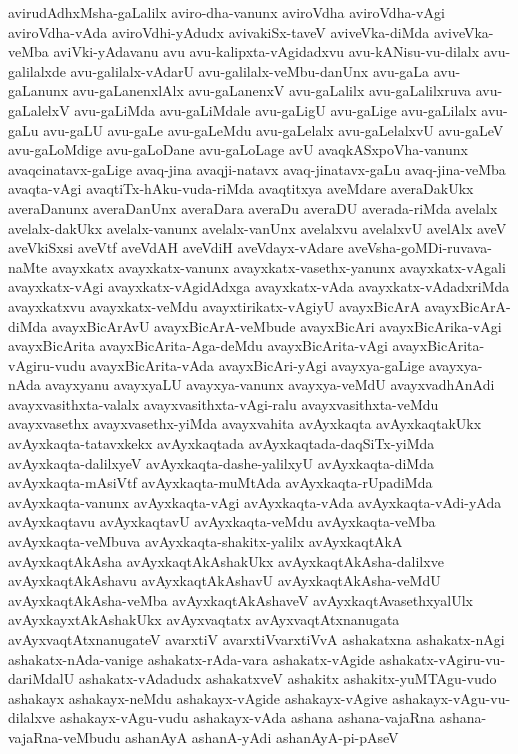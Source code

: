 {avirudAdhxMsha-gaLalilx
aviro-dha-vanunx
aviroVdha
aviroVdha-vAgi
aviroVdha-vAda
aviroVdhi-yAdudx
avivakiSx-taveV
aviveVka-diMda
aviveVka-veMba
aviVki-yAdavanu
avu
avu-kalipxta-vAgidadxvu
avu-kANisu-vu-dilalx
avu-galilalxde
avu-galilalx-vAdarU
avu-galilalx-veMbu-danUnx
avu-gaLa
avu-gaLanunx
avu-gaLanenxlAlx
avu-gaLanenxV
avu-gaLalilx
avu-gaLalilxruva
avu-gaLalelxV
avu-gaLiMda
avu-gaLiMdale
avu-gaLigU
avu-gaLige
avu-gaLilalx
avu-gaLu
avu-gaLU
avu-gaLe
avu-gaLeMdu
avu-gaLelalx
avu-gaLelalxvU
avu-gaLeV
avu-gaLoMdige
avu-gaLoDane
avu-gaLoLage
avU
avaqkASxpoVha-vanunx
avaqcinatavx-gaLige
avaq-jina
avaqji-natavx
avaq-jinatavx-gaLu
avaq-jina-veMba
avaqta-vAgi
avaqtiTx-hAku-vuda-riMda
avaqtitxya
aveMdare
averaDakUkx
averaDanunx
averaDanUnx
averaDara
averaDu
averaDU
averada-riMda
avelalx
avelalx-dakUkx
avelalx-vanunx
avelalx-vanUnx
avelalxvu
avelalxvU
avelAlx
aveV
aveVkiSxsi
aveVtf
aveVdAH
aveVdiH
aveVdayx-vAdare
aveVsha-goMDi-ruvava-naMte
avayxkatx
avayxkatx-vanunx
avayxkatx-vasethx-yanunx
avayxkatx-vAgali
avayxkatx-vAgi
avayxkatx-vAgidAdxga
avayxkatx-vAda
avayxkatx-vAdadxriMda
avayxkatxvu
avayxkatx-veMdu
avayxtirikatx-vAgiyU
avayxBicArA
avayxBicArA-diMda
avayxBicArAvU
avayxBicArA-veMbude
avayxBicAri
avayxBicArika-vAgi
avayxBicArita
avayxBicArita-Aga-deMdu
avayxBicArita-vAgi
avayxBicArita-vAgiru-vudu
avayxBicArita-vAda
avayxBicAri-yAgi
avayxya-gaLige
avayxya-nAda
avayxyanu
avayxyaLU
avayxya-vanunx
avayxya-veMdU
avayxvadhAnAdi
avayxvasithxta-valalx
avayxvasithxta-vAgi-ralu
avayxvasithxta-veMdu
avayxvasethx
avayxvasethx-yiMda
avayxvahita
avAyxkaqta
avAyxkaqtakUkx
avAyxkaqta-tatavxkekx
avAyxkaqtada
avAyxkaqtada-daqSiTx-yiMda
avAyxkaqta-dalilxyeV
avAyxkaqta-dashe-yalilxyU
avAyxkaqta-diMda
avAyxkaqta-mAsiVtf
avAyxkaqta-muMtAda
avAyxkaqta-rUpadiMda
avAyxkaqta-vanunx
avAyxkaqta-vAgi
avAyxkaqta-vAda
avAyxkaqta-vAdi-yAda
avAyxkaqtavu
avAyxkaqtavU
avAyxkaqta-veMdu
avAyxkaqta-veMba
avAyxkaqta-veMbuva
avAyxkaqta-shakitx-yalilx
avAyxkaqtAkA
avAyxkaqtAkAsha
avAyxkaqtAkAshakUkx
avAyxkaqtAkAsha-dalilxve
avAyxkaqtAkAshavu
avAyxkaqtAkAshavU
avAyxkaqtAkAsha-veMdU
avAyxkaqtAkAsha-veMba
avAyxkaqtAkAshaveV
avAyxkaqtAvasethxyalUlx
avAyxkayxtAkAshakUkx
avAyxvaqtatx
avAyxvaqtAtxnanugata
avAyxvaqtAtxnanugateV
avarxtiV
avarxtiVvarxtiVvA
ashakatxna
ashakatx-nAgi
ashakatx-nAda-vanige
ashakatx-rAda-vara
ashakatx-vAgide
ashakatx-vAgiru-vu-dariMdalU
ashakatx-vAdadudx
ashakatxveV
ashakitx
ashakitx-yuMTAgu-vudo
ashakayx
ashakayx-neMdu
ashakayx-vAgide
ashakayx-vAgive
ashakayx-vAgu-vu-dilalxve
ashakayx-vAgu-vudu
ashakayx-vAda
ashana
ashana-vajaRna
ashana-vajaRna-veMbudu
ashanAyA
ashanA-yAdi
ashanAyA-pi-pAseV
}
